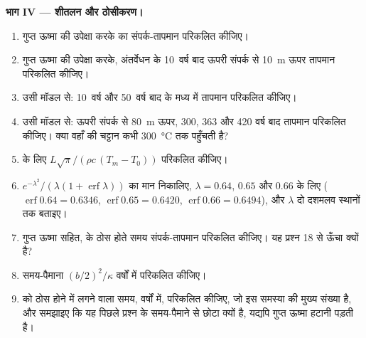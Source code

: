 \begin{problem}
\noindent\textbf{भाग IV --- शीतलन और ठोसीकरण।}
\begin{enumerate}[resume]
\item गुप्त ऊष्मा की उपेक्षा करके  का संपर्क-तापमान परिकलित कीजिए।
\item गुप्त ऊष्मा की उपेक्षा करके, अंतर्वेधन के \num{10}~वर्ष बाद ऊपरी
संपर्क से \qty{10}{m} ऊपर तापमान परिकलित कीजिए।
\item उसी मॉडल से: \num{10}~वर्ष और \num{50}~वर्ष बाद  के मध्य में
तापमान परिकलित कीजिए।
\item उसी मॉडल से: ऊपरी संपर्क से \qty{80}{m} ऊपर, \num{300}, \num{363} और \num{420} वर्ष बाद
तापमान परिकलित कीजिए। क्या वहाँ की चट्टान कभी
\qty{300}{\celsius} तक पहुँचती है?
\item {} के लिए $L\sqrt\pi/(\rho c\,(T_m - T_0))$ परिकलित कीजिए।
\item $e^{-\lambda^2}/(\lambda(1 + \operatorname{erf}\lambda))$ का मान निकालिए, $\lambda = 0.64$,
$0.65$ और $0.66$ के लिए ($\operatorname{erf}0.64 = 0.6346$, $\operatorname{erf}0.65 = 0.6420$,
$\operatorname{erf}0.66 = 0.6494$), और $\lambda$ दो दशमलव स्थानों तक बताइए।
\item गुप्त ऊष्मा सहित,  के ठोस होते समय संपर्क-तापमान परिकलित कीजिए। यह
प्रश्न 18 से ऊँचा क्यों है?
\item समय-पैमाना $(b/2)^2/\kappa$ वर्षों में परिकलित कीजिए।
\item {} को ठोस होने में लगने वाला समय, वर्षों में, परिकलित कीजिए, जो इस
समस्या की मुख्य संख्या है, और समझाइए कि यह पिछले प्रश्न के समय-पैमाने से छोटा क्यों है,
यद्यपि गुप्त ऊष्मा हटानी पड़ती है।
\end{enumerate}
\end{problem}
